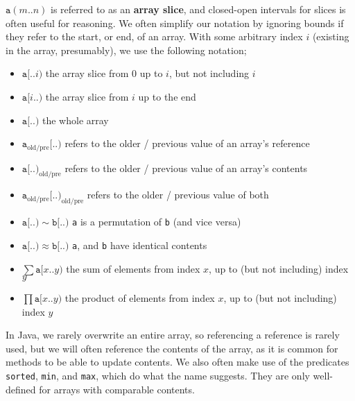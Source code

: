 \documentclass[a4paper, 12pt]{article}
\begin{document}
            $\texttt{a}(m..n)$ is referred to as an \textbf{array slice}, and closed-open intervals for slices is often useful for reasoning. We often simplify our notation by ignoring bounds if they refer to the start, or end, of an array. With some arbitrary index $i$ (existing in the array, presumably), we use the following notation;
            \begin{itemize}
                \itemsep0em
                \item $\texttt{a}[..i)$ \hfill the array slice from 0 up to $i$, but not including $i$
                \item $\texttt{a}[i..)$ \hfill the array slice from $i$ up to the end
                \item $\texttt{a}[..)$ \hfill the whole array
                \item $\texttt{a}_\text{old/pre}[..)$ \hfill refers to the older / previous value of an array's reference
                \item $\texttt{a}[..)_\text{old/pre}$ \hfill refers to the older / previous value of an array's contents
                \item $\texttt{a}_\text{old/pre}[..)_\text{old/pre}$ \hfill refers to the older / previous value of both
                \item $\texttt{a}[..) \sim \texttt{b}[..)$ \hfill \texttt{a} is a permutation of \texttt{b} (and vice versa)
                \item $\texttt{a}[..) \approx \texttt{b}[..)$ \hfill \texttt{a}, and \texttt{b} have identical contents
                \item $\sum \texttt{a}[x..y)$ \hfill the sum of elements from index $x$, up to (but not including) index $y$
                \item $\prod \texttt{a}[x..y)$ \hfill the product of elements from index $x$, up to (but not including) index $y$
            \end{itemize}
            In Java, we rarely overwrite an entire array, so referencing a reference is rarely used, but we will often reference the contents of the array, as it is common for methods to be able to update contents. We also often make use of the predicates \texttt{sorted}, \texttt{min}, and \texttt{max}, which do what the name suggests. They are only well-defined for arrays with comparable contents.
            \medskip
\end{document}
